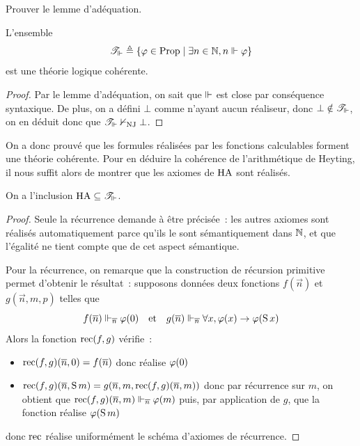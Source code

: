 \begin{exercise}
  Prouver le lemme d'adéquation.
\end{exercise}

\begin{corollary}
  L'ensemble
  \[\mathscr T_{\Vdash} \triangleq \left\{ \varphi \in \operatorname{Prop} \;\middle\vert\; \exists n \in \mathbb N, n\Vdash \varphi \right\}\]
         est une théorie logique cohérente.
\end{corollary}

\begin{proof}
  Par le lemme d'adéquation, on sait que $\Vdash$ est close par conséquence
  syntaxique. De plus, on a défini $\bot$ comme n'ayant aucun réaliseur, donc
  $\bot\notin\mathscr T_{\Vdash}$, on en déduit donc que
  $\mathscr T_{\Vdash}\nvdash_{\operatorname{NJ}} \bot$.
\end{proof}

On a donc prouvé que les formules réalisées par les fonctions calculables
forment une théorie cohérente. Pour en déduire la cohérence de l'arithmétique de
Heyting, il nous suffit alors de montrer que les axiomes de $\operatorname{HA}$ sont réalisés.

\begin{lemma}
  On a l'inclusion $\operatorname{HA}\subseteq\mathscr T_{\Vdash}$.
\end{lemma}

\begin{proof}
  Seule la récurrence demande à être précisée~: les autres axiomes sont
  réalisés automatiquement parce qu'ils le sont sémantiquement dans $\mathbb N$, et
  que l'égalité ne tient compte que de cet aspect sémantique.

  Pour la récurrence, on remarque que la construction de récursion primitive
  permet d'obtenir le résultat~: supposons données deux fonctions
  $f(\vec n)$ et $g(\vec n,m,p)$ telles que
  \[f(\overline{n})\Vdash_{\overline{n}} \varphi(0)\quad\text{et}\quad
  g(\overline{n}) \Vdash_{\overline{n}} \forall x, \varphi(x) \to \varphi(\operatorname{S} x)\]
  Alors la fonction $\operatorname{rec}(f,g)$ vérifie~:
  \begin{itemize}
  \item $\operatorname{rec}(f,g)(\overline{n},0) = f(\overline{n})$ donc réalise $\varphi(0)$
  \item $\operatorname{rec}(f,g)(\overline{n},\operatorname{S} m) = g(\overline{n},m,\operatorname{rec}(f,g)(\overline{n},m))$ donc par
    récurrence sur $m$, on obtient que
    $\operatorname{rec}(f,g)(\overline{n},m) \Vdash_{\overline{n}} \varphi(m)$ puis, par
    application de $g$, que la fonction réalise $\varphi(\operatorname{S} m)$
  \end{itemize}
  donc $\operatorname{rec}$ réalise uniformément le schéma d'axiomes de récurrence.
\end{proof}

